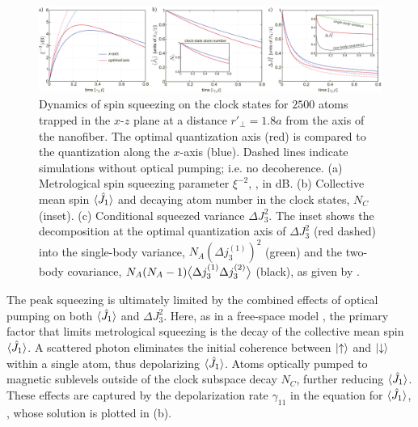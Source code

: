\documentclass[preprint, aps,pra,onecolumn]{revtex4-1} %
\newcommand{\varz}{\Delta J_3^2}
\newcommand{\jx}{\hat{J}_1}
\begin{document}
\begin{figure}[t]
\includegraphics[scale=0.42]{./Fig4}
\caption{Dynamics of spin squeezing on the clock states for $2500$ atoms trapped in the $x$-$z$ plane at a distance $ r'\!_\perp=1.8a$ from the axis of the nanofiber. 
The optimal quantization axis (red) is compared to the quantization along the $x$-axis (blue). 
Dashed lines indicate simulations without optical pumping; i.e. no decoherence. 
(a) Metrological spin squeezing parameter $\xi^{-2}$, , in dB. 
(b) Collective mean spin $\langle{\hat{J}_1}\rangle$ and decaying atom number in the clock states, $N_C$ (inset).
(c) Conditional squeezed variance $\varz$. 
The inset shows the decomposition at the optimal quantization axis of $ \Delta J_3^2 $ (red dashed) into the single-body variance, $N_A (\Delta j_3^{(1)})^2$ (green) and the two-body covariance, $N_A(N_A-1)\big\langle \Delta j_3^{(1)}\Delta j_3^{(2)} \big\rangle$ (black), as given by .
}\label{Fig::Squeezing_Dynamics}
\end{figure}


The peak squeezing is ultimately limited by the combined effects of optical pumping on both $\expt{\jx}$ and $\varz$.  Here, as in a free-space model \cite{baragiola_three-dimensional_2014}, the primary factor that limits metrological squeezing is the decay of the collective mean spin $\expt{\jx}$. 
A scattered photon eliminates the initial coherence between $\lvert{\uparrow}\rangle$ and $\lvert{\downarrow}\rangle$ within a single atom, thus depolarizing $\expt{\jx}$.  
Atoms optically pumped to magnetic sublevels outside of the clock subspace decay $N_C$, further reducing $\expt{\jx}$. 
These effects are captured by the depolarization rate $\gamma_{11}$ in the equation for $\expt{\jx}$, , whose solution is plotted in (b).
  
\end{document}
